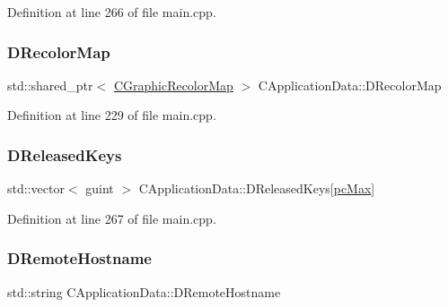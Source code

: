 Definition at line 266 of file main.\+cpp.

\hypertarget{classCApplicationData_afcbfb5d837afd5c117d91216d1988a53}{}\label{classCApplicationData_afcbfb5d837afd5c117d91216d1988a53} 
\subsubsection{\texorpdfstring{D\+Recolor\+Map}{DRecolorMap}}
{\footnotesize\ttfamily std\+::shared\+\_\+ptr$<$ \hyperlink{classCGraphicRecolorMap}{C\+Graphic\+Recolor\+Map} $>$ C\+Application\+Data\+::\+D\+Recolor\+Map\hspace{0.3cm}{\ttfamily [protected]}}



Definition at line 229 of file main.\+cpp.

\hypertarget{classCApplicationData_adcef59167cadd8ee516884a7c0df08f6}{}\label{classCApplicationData_adcef59167cadd8ee516884a7c0df08f6} 
\subsubsection{\texorpdfstring{D\+Released\+Keys}{DReleasedKeys}}
{\footnotesize\ttfamily std\+::vector$<$ guint $>$ C\+Application\+Data\+::\+D\+Released\+Keys\mbox{[}\hyperlink{GameDataTypes_8h_aafb0ca75933357ff28a6d7efbdd7602fa594a5c8dd3987f24e8a0f23f1a72cd34}{pc\+Max}\mbox{]}\hspace{0.3cm}{\ttfamily [protected]}}



Definition at line 267 of file main.\+cpp.

\hypertarget{classCApplicationData_a09da79011ab5ce6d6108d1c20f0e7c69}{}\label{classCApplicationData_a09da79011ab5ce6d6108d1c20f0e7c69} 
\subsubsection{\texorpdfstring{D\+Remote\+Hostname}{DRemoteHostname}}
{\footnotesize\ttfamily std\+::string C\+Application\+Data\+::\+D\+Remote\+Hostname\hspace{0.3cm}{\ttfamily [protected]}}



